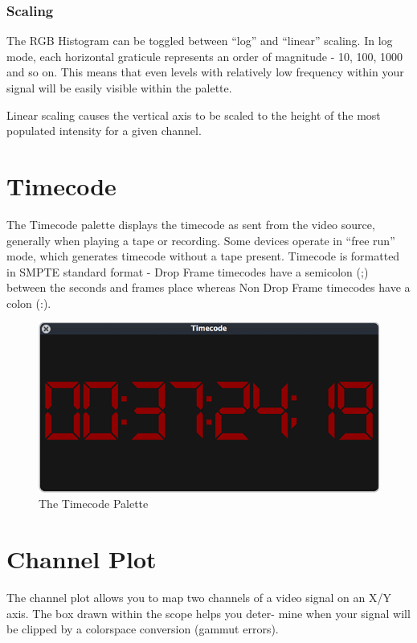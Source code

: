 \documentclass[10,letterpaper,]{report}
\begin{document}
\subsection{Scaling}

The RGB Histogram can be toggled between ``log'' and ``linear'' scaling.
In log mode, each horizontal graticule represents an order of magnitude
- 10, 100, 1000 and so on. This means that even levels with relatively
low frequency within your signal will be easily visible within the
palette.

Linear scaling causes the vertical axis to be scaled to the height of
the most populated intensity for a given channel.

\chapter{Timecode}

The Timecode palette displays the timecode as sent from the video
source, generally when playing a tape or recording. Some devices operate
in ``free run'' mode, which generates timecode without a tape present.
Timecode is formatted in SMPTE standard format - Drop Frame timecodes
have a semicolon (;) between the seconds and frames place whereas Non
Drop Frame timecodes have a colon (:).

\begin{figure}[htbp]
\centering
\includegraphics{images/Timecode.png}
\caption{The Timecode Palette}
\end{figure}

\chapter{Channel Plot}

The channel plot allows you to map two channels of a video signal on an
X/Y axis. The box drawn within the scope helps you deter- mine when your
signal will be clipped by a colorspace conversion (gammut errors).
\end{document}
